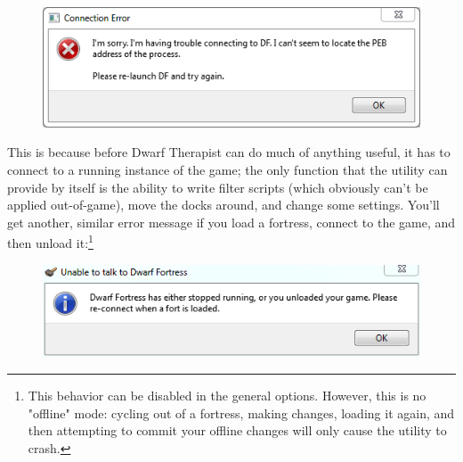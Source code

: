 \documentclass[]{article}
\begin{document}
\vfill \begin{figure}[h!] \centering
\includegraphics{Sec1Fig1}
\end{figure}
\vfill

This is because before Dwarf Therapist can do much of anything useful, it has to connect to a running
instance of the game; the only function that the utility can provide by itself is the ability to write
filter scripts (which obviously can't be applied out-of-game), move the docks around, and change some
settings. You'll get another, similar error message if you load a fortress, connect to the game, and then
unload it:\footnote{This behavior can be disabled in the general options. However, this is no "offline"
mode: cycling out of a fortress, making changes, loading it again, and then attempting to commit your
offline changes will only cause the utility to crash.}

\vfill \begin{figure}[h!] \centering
\includegraphics{Sec1Fig2}
\end{figure}
\vfill
\end{document}
